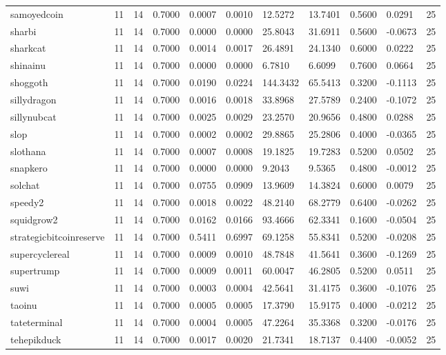 \begin{table}[htbp]
\begin{tabular}{lllllllllll}
samoyedcoin & 11 & 14 & 0.7000 & 0.0007 & 0.0010 & 12.5272 & 13.7401 & 0.5600 & 0.0291 & 25 \\
sharbi & 11 & 14 & 0.7000 & 0.0000 & 0.0000 & 25.8043 & 31.6911 & 0.5600 & -0.0673 & 25 \\
sharkcat & 11 & 14 & 0.7000 & 0.0014 & 0.0017 & 26.4891 & 24.1340 & 0.6000 & 0.0222 & 25 \\
shinainu & 11 & 14 & 0.7000 & 0.0000 & 0.0000 & 6.7810 & 6.6099 & 0.7600 & 0.0664 & 25 \\
shoggoth & 11 & 14 & 0.7000 & 0.0190 & 0.0224 & 144.3432 & 65.5413 & 0.3200 & -0.1113 & 25 \\
sillydragon & 11 & 14 & 0.7000 & 0.0016 & 0.0018 & 33.8968 & 27.5789 & 0.2400 & -0.1072 & 25 \\
sillynubcat & 11 & 14 & 0.7000 & 0.0025 & 0.0029 & 23.2570 & 20.9656 & 0.4800 & 0.0288 & 25 \\
slop & 11 & 14 & 0.7000 & 0.0002 & 0.0002 & 29.8865 & 25.2806 & 0.4000 & -0.0365 & 25 \\
slothana & 11 & 14 & 0.7000 & 0.0007 & 0.0008 & 19.1825 & 19.7283 & 0.5200 & 0.0502 & 25 \\
snapkero & 11 & 14 & 0.7000 & 0.0000 & 0.0000 & 9.2043 & 9.5365 & 0.4800 & -0.0012 & 25 \\
solchat & 11 & 14 & 0.7000 & 0.0755 & 0.0909 & 13.9609 & 14.3824 & 0.6000 & 0.0079 & 25 \\
speedy2 & 11 & 14 & 0.7000 & 0.0018 & 0.0022 & 48.2140 & 68.2779 & 0.6400 & -0.0262 & 25 \\
squidgrow2 & 11 & 14 & 0.7000 & 0.0162 & 0.0166 & 93.4666 & 62.3341 & 0.1600 & -0.0504 & 25 \\
strategicbitcoinreserve & 11 & 14 & 0.7000 & 0.5411 & 0.6997 & 69.1258 & 55.8341 & 0.5200 & -0.0208 & 25 \\
supercyclereal & 11 & 14 & 0.7000 & 0.0009 & 0.0010 & 48.7848 & 41.5641 & 0.3600 & -0.1269 & 25 \\
supertrump & 11 & 14 & 0.7000 & 0.0009 & 0.0011 & 60.0047 & 46.2805 & 0.5200 & 0.0511 & 25 \\
suwi & 11 & 14 & 0.7000 & 0.0003 & 0.0004 & 42.5641 & 31.4175 & 0.3600 & -0.1076 & 25 \\
taoinu & 11 & 14 & 0.7000 & 0.0005 & 0.0005 & 17.3790 & 15.9175 & 0.4000 & -0.0212 & 25 \\
tateterminal & 11 & 14 & 0.7000 & 0.0004 & 0.0005 & 47.2264 & 35.3368 & 0.3200 & -0.0176 & 25 \\
tehepikduck & 11 & 14 & 0.7000 & 0.0017 & 0.0020 & 21.7341 & 18.7137 & 0.4400 & -0.0052 & 25 \\

\end{tabular}
\end{table}
